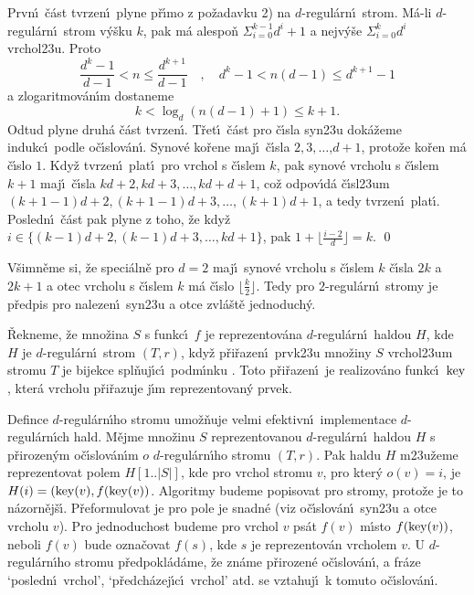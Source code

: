 Prvn\'\i\ \v c\'ast tvrzen\'\i\ plyne p\v r\'\i mo z po\v zadavku 2) na 
$d$-regul\'arn\'\i\ strom. M\'a-li $d$-regul\'arn\'\i\ strom v\'y\v sku $
k$, 
pak m\'a alespo\v n $\Sigma_{i=0}^{k-1}d^i+1$ a nejv\'y\v se $\Sigma_{
i=0}^kd^i$ 
vrchol\accent23u. Proto
$$\frac {d^k-1}{d-1}<n\le\frac {d^{k+1}}{d-1}\quad ,\quad d^k-1<n
(d-1)\le d^{k+1}-1$$
a zlogaritmov\'an\'\i m dostaneme
$$k<\log_d(n(d-1)+1)\le k+1.$$
Odtud plyne 
druh\'a \v c\'ast tvrzen\'\i .  T\v ret\'\i\ \v c\'ast pro \v c\'\i sla syn\accent23u dok\'a\v zeme 
indukc\'\i\ podle o\v c\'\i slov\'a\-n\'\i .  Synov\'e ko\v rene maj\'\i\ \v c\'\i sla 
$2,3,\dots$,$d+1$,  proto\v ze ko\v ren m\'a \v c\'\i slo $1$.  Kdy\v z tvrzen\'\i\ plat\'\i\ 
pro vrchol s \v c\'\i slem $k$, pak synov\'e vrcholu s \v c\'\i slem $
k+1$ 
maj\'\i\ \v c\'\i sla $kd+2,kd+3,\dots,kd+d+1$, co\v z odpov\'\i d\'a 
\v c\'\i sl\accent23um $(k+1-1)d+2,(k+1-1)d+3,\dots,(k+1)d+1$, a tedy 
tvrzen\'\i\ plat\'\i . Posledn\'\i\ \v c\'ast pak plyne z toho, \v ze kdy\v z $
i\in \{(k-1)d+2,(k-1)d+3,\dots,kd+1\}$, pak 
$1+\lfloor\frac {i-2}d\rfloor =k$. \qed
\enddemo

\flushpar V\v simn\v eme si, \v ze speci\'aln\v e pro $d=2$ maj\'\i\ synov\'e vrcholu s \v c\'\i slem $
k$ 
\v c\'\i sla $2k$ a $2k+1$ a otec vrcholu s \v c\'\i slem $k$ m\'a \v c\'\i slo 
$\lfloor\frac k2\rfloor$. Tedy pro $2$-regul\'arn\'\i\ stromy je p\v redpis pro nalezen\'\i\ 
syn\accent23u a otce zvl\'a\v st\v e jednoduch\'y.  
\medskip

\flushpar\v Rekneme, \v ze mno\v zina $S$ s funkc\'\i\ $f$ je reprezentov\'ana 
$d$-regul\'ar\-n\'\i\ haldou $H$, kde $H$ je $d$-regul\'arn\'\i\ strom $
(T,r)$, kdy\v z 
p\v ri\v razen\'\i\ prvk\accent23u mno\v ziny $S$ vrchol\accent23um stromu 
$T$ je bijekce spl\v nuj\'\i c\'\i\ podm\'\i nku . Toto p\v ri\v razen\'\i\ 
je realizov\'ano funkc\'\i\ $\operatorname{key}$, kter\'a vrcholu p\v ri\v razuje j\'\i m 
reprezentovan\'y prvek.
\medskip

\flushpar Defince $d$-regul\'arn\'\i ho stromu umo\v z\v nuje velmi efektivn\'\i\ 
implementace $d$-regul\'arn\'\i ch hald.  M\v ej\-me mno\v zinu $
S$ 
reprezentovanou $d$-regul\'arn\'\i\ haldou $H$ s p\v rirozen\'ym 
o\v c\'\i s\-lo\-v\'a\-n\'\i m $o$ $d$-regul\'arn\'\i\-ho stromu $
(T,r)$.  Pak haldu $H$ 
m\accent23u\v zeme reprezentovat polem $H[1..|S|]$, kde pro vrchol 
stromu $v$, pro kter\'y $o(v)=i$, je $H(i)=(\operatorname{key}(v),f(\operatorname{key}(v))$.  Algoritmy 
budeme popisovat pro stromy, proto\v ze je to n\'azorn\v ej\v s\'\i .  
P\v reformulovat je pro pole je snadn\'e (viz 
o\v c\'\i slov\'an\'\i\ syn\accent23u a otce vrcholu $v$).  Pro jednoduchost 
budeme pro vrchol $v$ ps\'at $f(v)$ m\'\i sto $f(\operatorname{key}(v))$, neboli $
f(v)$ 
bude ozna\v covat $f(s)$, kde $s$ je reprezentov\'an vrcholem $v$.  U 
$d$-regul\'arn\'\i ho stromu p\v redpo\-kl\'a\-d\'ame, \v ze zn\'ame p\v rirozen\'e 
o\v c\'\i slov\'an\'\i , a fr\'aze `posledn\'\i\ vrchol', `p\v red\-ch\'azej\'\i c\'\i\ vrchol' atd.  
se vztahuj\'\i\ k tomuto o\v c\'\i slov\'an\'\i .  
\bigskip

